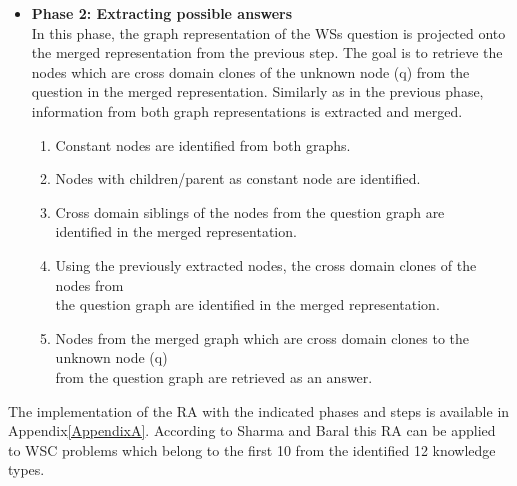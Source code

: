\begin{itemize}
	\item \textbf{Phase 2: Extracting possible answers}\\
	In this phase, the graph representation of the WSs question is projected onto the merged representation from the previous step. The goal is to retrieve the nodes which are cross domain clones of the unknown node (q) from the question in the merged representation. Similarly as in the previous phase, information from both graph representations is extracted and merged.
	\begin{enumerate}
		\item Constant nodes are identified from both graphs.
		\item Nodes with children/parent as constant node are identified. 
		\item Cross domain siblings of the nodes from the question graph are \\ identified in the merged representation.
		\item Using the previously extracted nodes, the cross domain clones of the nodes from\\ the question graph are identified in the merged representation.
		\item Nodes from the merged graph which are cross domain clones to the unknown node (q)\\ from the question graph are retrieved as an answer.
	\end{enumerate}
\end{itemize}

The implementation of the RA with the indicated phases and steps is available in Appendix\ref{AppendixA}. 
According to Sharma and Baral \cite{2018CommonsenseKT} this RA can be applied to WSC problems which belong to the first 10 from the identified 12 knowledge types. 

